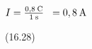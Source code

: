 {\begin{mdframed}[linewidth=4, leftmargin=40, rightmargin=40]
\begin{exercise}
\begin{enumerate}[noitemsep, label=\textbf{Step} \textbf{\arabic*}. ]
{\begin{minipage}{\columnwidth}
    \parbox[t]{\mymathboxwidth}{\large\begin{math}
    I=\frac{0,8\phantom{\rule{2pt}{0ex}}\mathrm{C}}{1\phantom{\rule{2pt}{0ex}}\mathrm{s}}\phantom{x}=0,8\phantom{\rule{2pt}{0ex}}\mathrm{A}\end{math}}\hfill
    \parbox[t]{48pt}{\raggedleft 
    (16.28)}
    \end{minipage}\vspace{12pt}\par
    }%
    \end{enumerate}
        


    \end{exercise}
    \end{mdframed}
    }
    \noindent
  
    
\par
            \label{m38773*exid002}\vspace{.5cm} 
      
